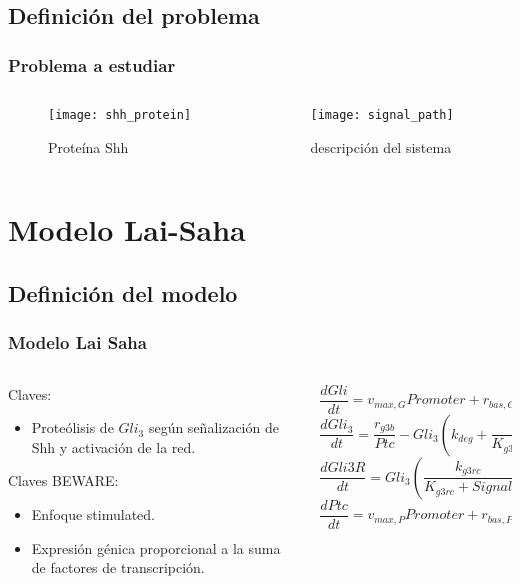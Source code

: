 \documentclass{beamer}
\begin{document}
\subsection{Definición del problema}

\begin{frame}
\frametitle{Problema a estudiar}
\begin{columns}
	\begin{column}{0.5\textwidth}
\begin{figure}
\texttt{[image: shh\_protein]}\caption{Proteína Shh}
\end{figure}
\end{column}
\begin{column}{0.5\textwidth}
\begin{figure}
	\texttt{[image: signal\_path]}\caption{descripción del sistema}
\end{figure}
\end{column}
\end{columns}
\end{frame}

\section{Modelo Lai-Saha}
\subsection{Definición del modelo}
\begin{frame}
  \frametitle{Modelo Lai Saha}
\begin{columns}
	\begin{column}{0.5\textwidth}
		Claves:
		\begin{itemize}
			\item Proteólisis de $Gli_3$ según señalización de Shh y activación de la red. 
		\end{itemize}
			Claves BEWARE:
	\begin{itemize}
		\item Enfoque stimulated.
		\item Expresión génica proporcional a la suma de factores de transcripción.
	\end{itemize}
	\end{column}
	\begin{column}{0.5\textwidth}
		{\tiny\[ \frac{dGli}{dt} = v_{max,G}Promoter+r_{bas,G}Basal-k_{deg}Gli \]}
		{\tiny\[ \frac{dGli_3}{dt} = \frac{r_{g3b}}{Ptc}-Gli_3\left(k_{deg}+\frac{k_{g3rc}}{K_{g3rc}+Signal}\right), \]}
		{\tiny\[ \frac{dGli3R}{dt}= Gli_3\left(\frac{k_{g3rc}}{K_{g3rc}+Signal}\right)-k_{deg}Gli3R, \]}
		{\tiny\[ \frac{dPtc}{dt} = v_{max,P}Promoter+r_{bas,P}Basal-k_{degp}Ptc.\]}

	\end{column}
\end{columns}
\end{frame}
\end{document}
